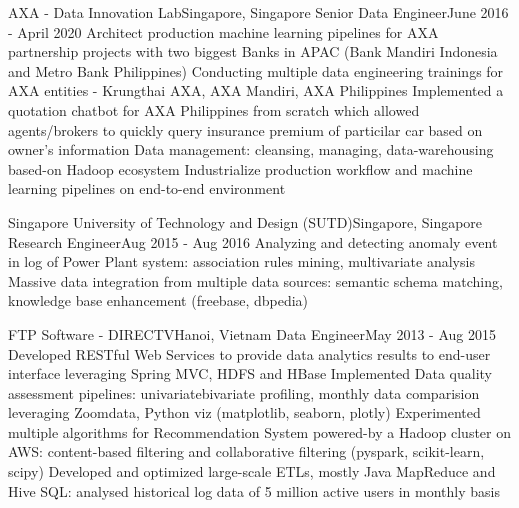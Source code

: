    \resumeSubheading
      {AXA - Data Innovation Lab}{Singapore, Singapore}
      {Senior Data Engineer}{June 2016 - April 2020}
      \resumeItemListStart
          {Architect production machine learning pipelines for AXA partnership projects with two biggest Banks in APAC (Bank Mandiri Indonesia and Metro Bank Philippines)}
          {Conducting multiple data engineering trainings for AXA entities - Krungthai AXA, AXA Mandiri, AXA Philippines}
          {Implemented a quotation chatbot for AXA Philippines from scratch which allowed agents/brokers to quickly query insurance premium of particilar car based on owner's information}
          {Data management: cleansing, managing, data-warehousing based-on Hadoop ecosystem}
          {Industrialize production workflow and machine learning pipelines on end-to-end environment}
      \resumeItemListEnd
    
    \resumeSubheading
      {Singapore University of Technology and Design (SUTD)}{Singapore, Singapore}
      {Research Engineer}{Aug 2015 - Aug 2016}
      \resumeItemListStart
          {Analyzing and detecting anomaly event in log of Power Plant system: association rules mining, multivariate analysis}
          {Massive data integration from multiple data sources: semantic schema matching, knowledge base enhancement (freebase, dbpedia)}
      \resumeItemListEnd

    \resumeSubheading
      {FTP Software - DIRECTV}{Hanoi, Vietnam}
      {Data Engineer}{May 2013 - Aug 2015}
      \resumeItemListStart
          {Developed RESTful Web Services to provide data analytics results to end-user interface leveraging Spring MVC, HDFS and HBase}
          {Implemented Data quality assessment pipelines: univariate\/bivariate profiling, monthly data comparision leveraging Zoomdata, Python viz (matplotlib, seaborn, plotly)}
          {Experimented multiple algorithms for Recommendation System powered-by a Hadoop cluster on AWS: content-based filtering and collaborative filtering (pyspark, scikit-learn, scipy)}
          {Developed and optimized large-scale ETLs, mostly Java MapReduce and Hive SQL: analysed historical log data of 5 million active users in monthly basis}
      \resumeItemListEnd

